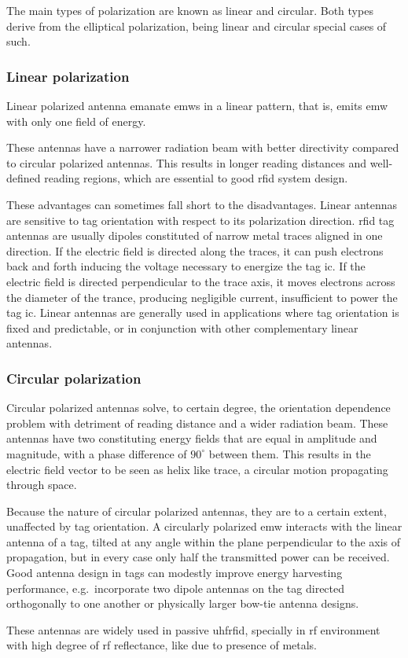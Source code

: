 The main types of polarization are known as linear and circular. Both types derive from the elliptical polarization, being linear and circular special cases of such.

\subsubsection{Linear polarization}

Linear polarized antenna emanate \acp{emw} in a linear pattern, that is, emits \ac{emw} with only one field of energy.

These antennas have a narrower radiation beam with better directivity compared to circular polarized antennas. This results in longer reading distances and well-defined reading regions, which are essential to good \ac{rfid} system design.

These advantages can sometimes fall short to the disadvantages. Linear antennas are sensitive to tag orientation with respect to its polarization direction. 
\ac{rfid} tag antennas are usually dipoles constituted of narrow metal traces aligned in one direction. If the electric field is directed along the traces, it can push electrons back and forth inducing the voltage necessary to energize the tag \ac{ic}. If the electric field is directed perpendicular to the trace axis, it moves electrons across the diameter of the trance, producing negligible current, insufficient to power the tag \ac{ic}.
Linear antennas are generally used in applications where tag orientation is fixed and predictable, or in conjunction with other complementary linear antennas.

\subsubsection{Circular polarization}

Circular polarized antennas solve, to certain degree, the orientation dependence problem with detriment of reading distance and a wider radiation beam.
These antennas have two constituting energy fields that are equal in amplitude and magnitude, with a phase difference of $90^\circ$ between them. This results in the electric field vector to be seen as helix like trace, a circular motion propagating through space. 

Because the nature of circular polarized antennas, they are to a certain extent, unaffected by tag orientation.
A circularly polarized \ac{emw} interacts with the linear antenna of a tag, tilted at any angle within the plane perpendicular to the axis of propagation, but in every case only half the transmitted power can be received.
Good antenna design in tags can modestly improve energy harvesting performance, e.g.\ incorporate two dipole antennas on the tag directed orthogonally to one another or physically larger bow-tie antenna designs.

These antennas are widely used in passive \ac{uhfrfid}, specially in \ac{rf} environment with high degree of \ac{rf} reflectance, like due to presence of metals.

\cleardoublepage